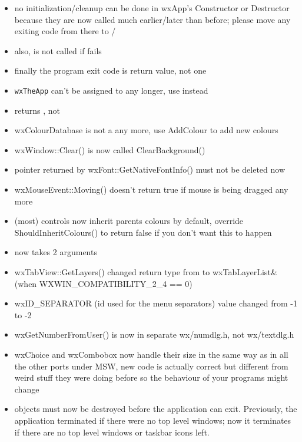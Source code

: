 \begin{itemize}\itemsep=0pt
\item no initialization/cleanup can be done in wxApp's Constructor or Destructor because they are now called much earlier/later than before; please move any exiting code from there to / 
\item also,  is not called if  fails
\item finally the program exit code is  return value, not  one
\item \texttt{wxTheApp} can't be assigned to any longer, use  instead
\item {} returns , not 
\item wxColourDatabase is not a  any more, use AddColour to add new colours
\item wxWindow::Clear() is now called ClearBackground()
\item pointer returned by wxFont::GetNativeFontInfo() must not be deleted now
\item wxMouseEvent::Moving() doesn't return true if mouse is being dragged any more
\item (most) controls now inherit parents colours by default, override ShouldInheritColours() to return false if you don't want this to happen
\item {} now takes 2 arguments
\item wxTabView::GetLayers() changed return type from  to wxTabLayerList\& (when WXWIN\_COMPATIBILITY\_2\_4 == 0)
\item wxID\_SEPARATOR (id used for the menu separators) value changed from -1 to -2
\item wxGetNumberFromUser() is now in separate wx/numdlg.h, not wx/textdlg.h
\item wxChoice and wxCombobox now handle their size in the same way as in all the other ports under MSW, new code is actually correct but different from weird stuff they were doing before so the behaviour of your programs might change
\item {} objects must now be destroyed before the application can exit.  Previously, the application terminated if there were no top level windows; now it terminates if there are no top level windows or taskbar icons left.

\end{itemize}
